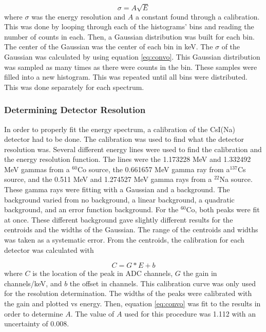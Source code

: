 \documentclass[../MaxHughesThesis.tex]{subfiles}
\begin{document}
\begin{equation}
	\sigma = A\sqrt{E}
	\label{eq:convo}
\end{equation}
where $\sigma$ was the energy resolution and $A$ a constant found through a calibration.
This was done by looping through each of the histograms' bins and reading the number of counts in each.
Then, a Gaussian distribution was built for each bin.
The center of the Gaussian was the center of each bin in keV.
The $\sigma$ of the Gaussian was calculated by using equation \ref{eq:convo}.
This Gaussian distribution was sampled as many times as there were counts in the bin.
These samples were filled into a new histogram.
This was repeated until all bins were distributed.
This was done separately for each spectrum. 

\subsubsection{Determining Detector Resolution}
In order to properly fit the energy spectrum, a calibration of the CsI(Na) detector had to be done.
The calibration was used to find what the detector resolution was.
Several different energy lines were used to find the calibration and the energy resolution function.
The lines were the 1.173228 MeV and 1.332492 MeV gammas from a $^{60}$Co source, the 0.661657 MeV gamma ray from a$^{137}$Cs source, and the 0.511 MeV and 1.274527 MeV gamma rays from a $^{22}$Na source.
These gamma rays were fitting with a Gaussian and a background.
The background varied from no background, a linear background, a quadratic background, and an error function background.
For the $^{60}$Co, both peaks were fit at once.
These different background gave slightly different results for the centroids and the widths of the Gaussian.
The range of the centroids and widths was taken as a systematic error.
From the centroids, the calibration for each detector was calculated with 

\begin{equation}
	C = G * E + b
	\label{eq:cal}
\end{equation}
where $C$ is the location of the peak in ADC channels, $G$ the gain in channels/keV, and $b$ the offset in channels.
This calibration curve was only used for the resolution determination.
The widths of the peaks were calibrated with the gain and plotted vs energy.
Then, equation \ref{eq:convo} was fit to the results in order to determine $A$.
The value of $A$ used for this procedure was 1.112 with an uncertainty of 0.008.
\end{document}
